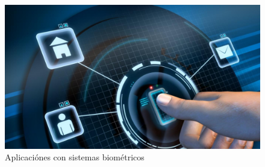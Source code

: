 \begin{figure}[h]
	\centering
	\includegraphics[scale=.2]{./Figures/sistemas_bio.png}
	\caption{Aplicaciónes con sistemas biométricos}
	\label{fig:sistemas_bio}
\end{figure}









